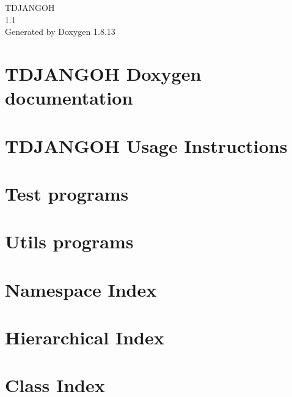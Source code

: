 \documentclass[twoside]{book}
\newcommand{\+}{\discretionary{\mbox{\scriptsize$\hookleftarrow$}}{}{}}
\newcommand{\clearemptydoublepage}{%
  \newpage{\pagestyle{empty}\cleardoublepage}%
}
\begin{document}
\hypersetup{pageanchor=false,
             bookmarksnumbered=true,
             pdfencoding=unicode
            }
\begin{titlepage}
\vspace*{7cm}
\begin{center}%
{\Large T\+D\+J\+A\+N\+G\+OH \\[1ex]\large 1.\+1 }\\
\vspace*{1cm}
{\large Generated by Doxygen 1.8.13}\\
\end{center}
\end{titlepage}
\clearemptydoublepage
{}
\tableofcontents
\clearemptydoublepage
{}
\hypersetup{pageanchor=true}

\chapter{T\+D\+J\+A\+N\+G\+OH Doxygen documentation}
\label{index}\hypertarget{index}{}
\chapter{T\+D\+J\+A\+N\+G\+OH Usage Instructions}
\label{md__r_e_a_d_m_e}

\chapter{Test programs}
\label{md_test__t_e_s_t_p_r_o_g_r_a_m_s}

\chapter{Utils programs}
\label{md_utils__u_t_i_l_s_p_r_o_g_r_a_m_s}

\chapter{Namespace Index}

\chapter{Hierarchical Index}

\chapter{Class Index}

\end{document}

